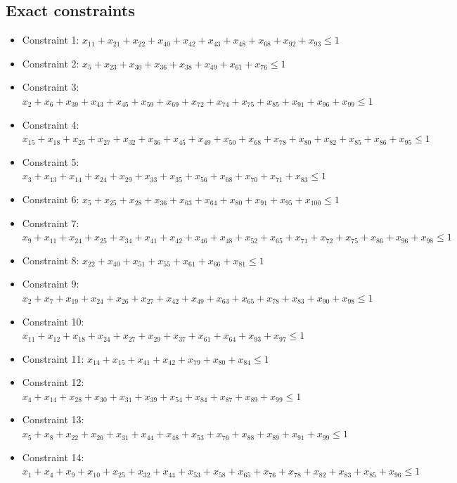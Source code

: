 \documentclass[11pt]{article}
\begin{document}
\subsection*{Exact constraints}
\begin{itemize}
\item Constraint 1: $x_{11} + x_{21} + x_{22} + x_{40} + x_{42} + x_{43} + x_{48} + x_{68} + x_{92} + x_{93} \le 1$
\item Constraint 2: $x_{5} + x_{23} + x_{30} + x_{36} + x_{38} + x_{49} + x_{61} + x_{76} \le 1$
\item Constraint 3: $x_{2} + x_{6} + x_{39} + x_{43} + x_{45} + x_{59} + x_{69} + x_{72} + x_{74} + x_{75} + x_{85} + x_{91} + x_{96} + x_{99} \le 1$
\item Constraint 4: $x_{15} + x_{18} + x_{25} + x_{27} + x_{32} + x_{36} + x_{45} + x_{49} + x_{50} + x_{68} + x_{78} + x_{80} + x_{82} + x_{85} + x_{86} + x_{95} \le 1$
\item Constraint 5: $x_{3} + x_{13} + x_{14} + x_{24} + x_{29} + x_{33} + x_{35} + x_{56} + x_{68} + x_{70} + x_{71} + x_{83} \le 1$
\item Constraint 6: $x_{5} + x_{25} + x_{28} + x_{36} + x_{63} + x_{64} + x_{80} + x_{91} + x_{95} + x_{100} \le 1$
\item Constraint 7: $x_{9} + x_{11} + x_{24} + x_{25} + x_{34} + x_{41} + x_{42} + x_{46} + x_{48} + x_{52} + x_{65} + x_{71} + x_{72} + x_{75} + x_{86} + x_{96} + x_{98} \le 1$
\item Constraint 8: $x_{22} + x_{40} + x_{51} + x_{55} + x_{61} + x_{66} + x_{81} \le 1$
\item Constraint 9: $x_{2} + x_{7} + x_{19} + x_{24} + x_{26} + x_{27} + x_{42} + x_{49} + x_{63} + x_{65} + x_{78} + x_{83} + x_{90} + x_{98} \le 1$
\item Constraint 10: $x_{11} + x_{12} + x_{18} + x_{24} + x_{27} + x_{29} + x_{37} + x_{61} + x_{64} + x_{93} + x_{97} \le 1$
\item Constraint 11: $x_{14} + x_{15} + x_{41} + x_{42} + x_{79} + x_{80} + x_{84} \le 1$
\item Constraint 12: $x_{4} + x_{14} + x_{28} + x_{30} + x_{31} + x_{39} + x_{54} + x_{84} + x_{87} + x_{89} + x_{99} \le 1$
\item Constraint 13: $x_{5} + x_{8} + x_{22} + x_{26} + x_{31} + x_{44} + x_{48} + x_{53} + x_{76} + x_{88} + x_{89} + x_{91} + x_{99} \le 1$
\item Constraint 14: $x_{1} + x_{4} + x_{9} + x_{10} + x_{25} + x_{32} + x_{44} + x_{53} + x_{58} + x_{65} + x_{76} + x_{78} + x_{82} + x_{83} + x_{85} + x_{96} \le 1$

\end{itemize}
\end{document}
